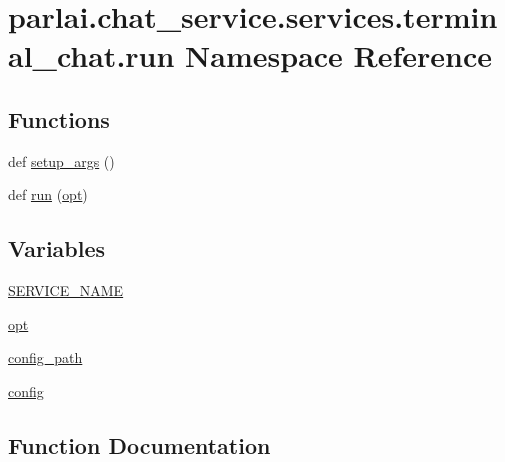 \hypertarget{namespaceparlai_1_1chat__service_1_1services_1_1terminal__chat_1_1run}{}\section{parlai.\+chat\+\_\+service.\+services.\+terminal\+\_\+chat.\+run Namespace Reference}
\label{namespaceparlai_1_1chat__service_1_1services_1_1terminal__chat_1_1run}
\subsection*{Functions}
\begin{DoxyCompactItemize}
\item 
def \hyperlink{namespaceparlai_1_1chat__service_1_1services_1_1terminal__chat_1_1run_a644a131d95fe6a2053b91eddd022fbf6}{setup\+\_\+args} ()
\item 
def \hyperlink{namespaceparlai_1_1chat__service_1_1services_1_1terminal__chat_1_1run_a2d090fbaf981ed8221ad1a1e5be061ea}{run} (\hyperlink{namespaceparlai_1_1chat__service_1_1services_1_1terminal__chat_1_1run_ade97c16037015a64e40e066cb389f922}{opt})
\end{DoxyCompactItemize}
\subsection*{Variables}
\begin{DoxyCompactItemize}
\item 
\hyperlink{namespaceparlai_1_1chat__service_1_1services_1_1terminal__chat_1_1run_a9ae6623a22cea3cd620e4a99964ee40b}{S\+E\+R\+V\+I\+C\+E\+\_\+\+N\+A\+ME}
\item 
\hyperlink{namespaceparlai_1_1chat__service_1_1services_1_1terminal__chat_1_1run_ade97c16037015a64e40e066cb389f922}{opt}
\item 
\hyperlink{namespaceparlai_1_1chat__service_1_1services_1_1terminal__chat_1_1run_abd978d236634b8e2de3e12adc2b65fd0}{config\+\_\+path}
\item 
\hyperlink{namespaceparlai_1_1chat__service_1_1services_1_1terminal__chat_1_1run_a4361047d588ccc6be7146ba6a063cd9f}{config}
\end{DoxyCompactItemize}


\subsection{Function Documentation}
\mbox{\label{namespaceparlai_1_1chat__service_1_1services_1_1terminal__chat_1_1run_a2d090fbaf981ed8221ad1a1e5be061ea}} 
